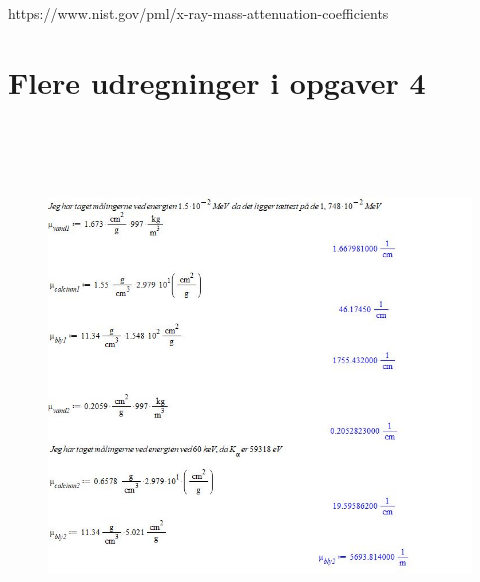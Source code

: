 \documentclass[a4paper,twoside]{article}
\begin{document}
https://www.nist.gov/pml/x-ray-mass-attenuation-coefficients


\section{Flere udregninger i opgaver 4}
\begin{figure}[H]
\begin{centering}
\includegraphics[height=14cm]{Opgave 4.jpg}
\hspace{1cm}
\par\end{centering}
\end{figure}
\end{document}
